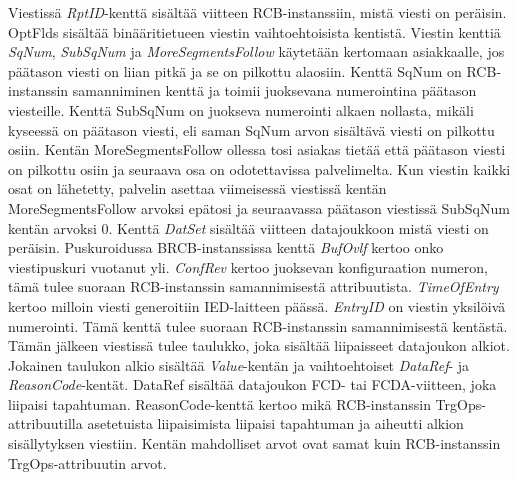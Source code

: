 Viestissä \emph{RptID}-kenttä sisältää viitteen RCB-instanssiin, mistä viesti on peräisin. OptFlds sisältää binääritietueen viestin vaihtoehtoisista kentistä. Viestin kenttiä \emph{SqNum}, \emph{SubSqNum} ja \emph{MoreSegmentsFollow} käytetään kertomaan asiakkaalle, jos päätason viesti on liian pitkä ja se on pilkottu alaosiin. Kenttä SqNum on RCB-instanssin samanniminen kenttä ja toimii juoksevana numerointina päätason viesteille. Kenttä SubSqNum on juokseva numerointi alkaen nollasta, mikäli kyseessä on päätason viesti, eli saman SqNum arvon sisältävä viesti on pilkottu osiin. Kentän MoreSegmentsFollow ollessa tosi asiakas tietää että päätason viesti on pilkottu osiin ja seuraava osa on odotettavissa palvelimelta. Kun viestin kaikki osat on lähetetty, palvelin asettaa viimeisessä viestissä kentän MoreSegmentsFollow arvoksi epätosi ja seuraavassa päätason viestissä SubSqNum kentän arvoksi 0. Kenttä \emph{DatSet} sisältää viitteen datajoukkoon mistä viesti on peräisin. Puskuroidussa BRCB-instanssissa kenttä \emph{BufOvlf} kertoo onko viestipuskuri vuotanut yli. \emph{ConfRev} kertoo juoksevan konfiguraation numeron, tämä tulee suoraan RCB-instanssin samannimisestä attribuutista. \emph{TimeOfEntry} kertoo milloin viesti generoitiin IED-laitteen päässä. \emph{EntryID} on viestin yksilöivä numerointi. Tämä kenttä tulee suoraan RCB-instanssin samannimisestä kentästä. Tämän jälkeen viestissä tulee taulukko, joka sisältää liipaisseet datajoukon alkiot. Jokainen taulukon alkio sisältää \emph{Value}-kentän ja vaihtoehtoiset \emph{DataRef}- ja \emph{ReasonCode}-kentät. DataRef sisältää datajoukon FCD- tai FCDA-viitteen, joka liipaisi tapahtuman. ReasonCode-kenttä kertoo mikä RCB-instanssin TrgOps-attribuutilla asetetuista liipaisimista liipaisi tapahtuman ja aiheutti alkion sisällytyksen viestiin. Kentän mahdolliset arvot ovat samat kuin RCB-instanssin TrgOps-attribuutin arvot.

